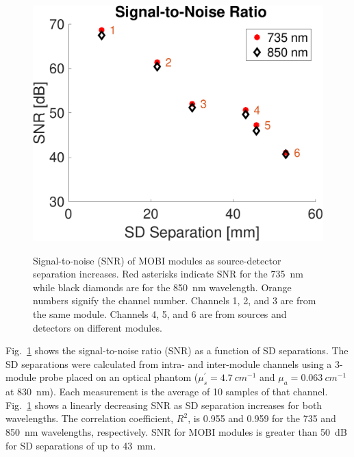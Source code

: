 \begin{figure}
	\begin{center}
	    {\includegraphics[width=.45\textwidth]{fig/mobi/snr.pdf}}
	\end{center}
	\caption{Signal-to-noise (SNR) of MOBI modules as source-detector separation increases. Red asterisks indicate SNR for the 735~nm while black diamonds are for the 850~nm wavelength. Orange numbers signify the channel number. Channels 1, 2, and 3 are from the same module. Channels 4, 5, and 6 are from sources and detectors on different modules.} 
	\label{fig:snr}
\end{figure} 
Fig.~\ref{fig:snr} shows the signal-to-noise ratio (SNR) as a function of SD separations. The SD separations were calculated from intra- and inter-module channels using a 3-module probe placed on an optical phantom ($\mu_{s}^{'} = 4.7~cm^{-1}$ and $\mu_{a} = 0.063~cm^{-1}$ at 830~nm). Each measurement is the average of 10 samples of that channel. Fig.~\ref{fig:snr} shows a linearly decreasing SNR as SD separation increases for both wavelengths. The correlation coefficient, $R^2$, is 0.955 and 0.959 for the 735 and 850~nm wavelengths, respectively. SNR for MOBI modules is greater than 50~dB for SD separations of up to 43~mm. 


